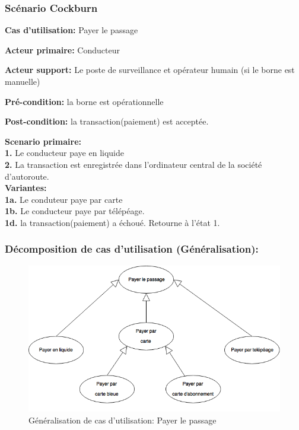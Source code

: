\subsubsection{Scénario Cockburn}
\textbf{Cas d'utilisation:} Payer le passage

\textbf{Acteur primaire:} Conducteur

\textbf{Acteur support:} Le poste de surveillance et opérateur humain (si le borne est manuelle)

\textbf{Pré-condition: }  la borne est opérationnelle

\textbf{Post-condition: }  la transaction(paiement) est acceptée.

\textbf{Scenario primaire: } \\ 
    \textbf{1.} Le conducteur paye en liquide %
    \\ 
    \textbf{2.} La transaction est enregistrée dans l’ordinateur central de la société d’autoroute.\\ 

\textbf{Variantes:}\\
    \textbf{1a.} Le conduteur paye par carte
    \\
    \textbf{1b.} Le conducteur paye par télépéage.
     \\
    \textbf{1d.} la transaction(paiement) a échoué. Retourne à l’état 1. \\ %
\newpage
\subsubsection{Décomposition de cas d'utilisation (Généralisation):} 
\begin{figure}[h]
    \centering
    \includegraphics[scale=0.5]{02_Desenvolvimento/TD2/images/PayeGeneralisation.png}
    \caption{Généralisation de cas d'utilisation: Payer le passage}
\end{figure}
